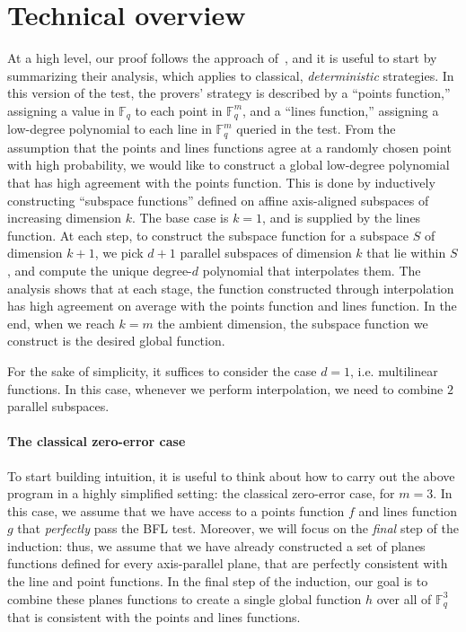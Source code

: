\documentclass[11pt]{article}
\theoremstyle{definition}
\newcommand{\F}{\mathbb F}
\begin{document}
\section{Technical overview}\label{sec:technical-overview}

At a high level, our proof follows the approach of~\cite{BFL91}, and
it is useful to start by summarizing their analysis, which applies to
classical, \emph{deterministic} strategies. In this version of the test, the provers' strategy is described
by a ``points function,'' assigning a value in $\F_q$ to each point in
$\F_q^m$, and a
``lines function,'' assigning a low-degree polynomial to each
line in $\F_q^{m}$ queried in the test. From the assumption that the
points and lines functions agree at a randomly chosen point with high
probability, we would like to construct a global low-degree polynomial that has high agreement with
the points function. This is done by inductively constructing
``subspace functions'' defined on affine axis-aligned subspaces of increasing
dimension $k$. The base case is $k=1$, and is supplied by the lines
function. At each step, to construct the subspace function for a
subspace $S$ of dimension $k+1$, we pick $d+1$ parallel subspaces of
dimension $k$ that lie within $S$, and compute the unique degree-$d$
polynomial that interpolates them. The analysis shows that at each
stage, the function constructed through interpolation has high
agreement on average with the points function and lines function. In
the end, when we reach $k=m$ the ambient dimension, the subspace
function we construct is the desired global function.

For the sake of simplicity, it suffices to consider the case $d=1$,
i.e. multilinear functions. In this case, whenever we perform
interpolation, we need to combine $2$ parallel subspaces.

\paragraph{The classical zero-error case}

To start building intuition, it is useful to think about how to carry
out the above program in a highly simplified setting: the classical
zero-error case, for $m=3$. In this case, we assume that we have access to a
points function $f$ and lines function $g$ that \emph{perfectly} pass the BFL
test. Moreover, we will focus on the \emph{final} step of the
induction: thus, we assume that we have already constructed a set of
planes functions defined for every axis-parallel plane, that are
perfectly consistent with the line and point functions. In the final
step of the induction, our goal is to combine these planes functions
to create a single global function $h$
over all of $\F_q^{3}$ that is consistent with the points and lines functions.
\end{document}
